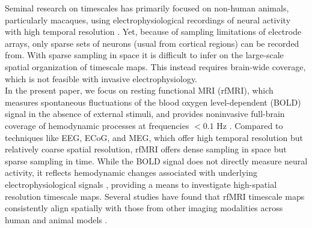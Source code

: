 \documentclass[latex/main.tex]{subfiles}
\begin{document}
Seminal research on timescales has primarily focused on non-human animals, particularly macaques, using electrophysiological recordings of neural activity with high temporal resolution \citep{murray_hierarchy_2014, cirillo_neural_2018, nougaret_intrinsic_2021, manea_intrinsic_2022}. Yet, because of sampling limitations of electrode arrays, only sparse sets of neurons (usual from cortical regions) can be recorded from. With sparse sampling in space it is difficult to infer on the large-scale spatial organization of timescale maps. This instead requires brain-wide coverage, which is not feasible with invasive electrophysiology.\\

In the present paper, we focus on resting functional MRI (rfMRI), which measures spontaneous fluctuations of the blood oxygen level-dependent (BOLD) signal in the absence of external stimuli, and provides noninvasive full-brain coverage of hemodynamic processes at frequencies $<0.1$ Hz \citep{raut_hierarchical_2020, he_scale-free_2011}. Compared to techniques like EEG, ECoG, and MEG, which offer high temporal resolution but relatively coarse spatial resolution, rfMRI offers dense sampling in space but sparse sampling in time. While the BOLD signal does not directly measure neural activity, it reflects hemodynamic changes associated with underlying electrophysiological signals \citep{logothetis_what_2008}, providing a means to investigate high-spatial resolution timescale maps. Several studies have found that rfMRI timescale maps consistently align spatially with those from other imaging modalities across human and animal models \citep{raut_hierarchical_2020, shafiei_topographic_2020, lurie_cortical_2024, mitra_lag_2014, kaneoke_variance_2012, wengler_distinct_2020, shinn_functional_2023, manea_intrinsic_2022, ito_cortical_2020, muller_core_2020}. \\
\end{document}
